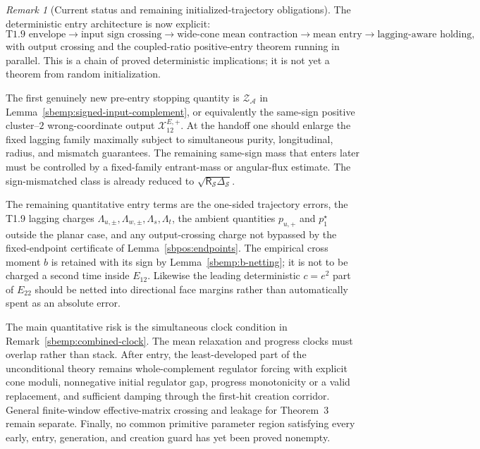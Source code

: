 \documentclass{article} %
\theoremstyle{plain}
\theoremstyle{definition}
\theoremstyle{remark}
\newtheorem{remark}[theorem]{Remark}
\begin{document}
\begin{remark}[Current status and remaining initialized-trajectory obligations]
\label{sbemp:remaining-entry-obligations}
The deterministic entry architecture is now explicit:
\[
 \text{T1.9 envelope}
 \longrightarrow
 \text{input sign crossing}
 \longrightarrow
 \text{wide-cone mean contraction}
 \longrightarrow
 \text{mean entry}
 \longrightarrow
 \text{lagging-aware holding},
\]
with output crossing and the coupled-ratio positive-entry theorem running in
parallel.  This is a chain of proved deterministic implications; it is not
yet a theorem from random initialization.

The first genuinely new pre-entry stopping quantity is
$\mathcal Z_{\mathcal A}$ in Lemma~\ref{sbemp:signed-input-complement}, or
equivalently the same-sign positive cluster--$2$ wrong-coordinate output
$\mathcal X_{12}^{E,+}$.  At the handoff one should enlarge the fixed
lagging family maximally subject to simultaneous purity, longitudinal,
radius, and mismatch guarantees.  The remaining same-sign mass that enters
later must be controlled by a fixed-family entrant-mass or angular-flux
estimate.  The sign-mismatched class is already reduced to
$\sqrt{\mathsf R_{\mathcal S}\Delta_{\mathcal S}}$.

The remaining quantitative entry terms are the one-sided trajectory errors,
the T1.9 lagging charges $\Lambda_{u,\pm},\Lambda_{w,\pm},\Lambda_s,
\Lambda_t$, the ambient quantities $p_{u,+}$ and $p_1^\star$ outside the
planar case, and any output-crossing charge not bypassed by the fixed-endpoint
certificate of Lemma~\ref{sbpos:endpoints}.  The empirical cross moment $b$
is retained with its sign by Lemma~\ref{sbemp:b-netting}; it is not to be
charged a second time inside $E_{12}$.  Likewise the leading deterministic
$c=e^2$ part of $E_{22}$ should be netted into directional face margins
rather than automatically spent as an absolute error.

The main quantitative risk is the simultaneous clock condition in
Remark~\ref{sbemp:combined-clock}.  The mean relaxation and progress clocks
must overlap rather than stack.  After entry, the least-developed part of
the unconditional theory remains whole-complement regulator forcing with
explicit cone moduli, nonnegative initial regulator gap, progress
monotonicity or a valid replacement, and sufficient damping through the
first-hit creation corridor.  General finite-window effective-matrix
crossing and leakage for Theorem~3 remain separate.  Finally, no common
primitive parameter region satisfying every early, entry, generation, and
creation guard has yet been proved nonempty.
\end{remark}
\end{document}
